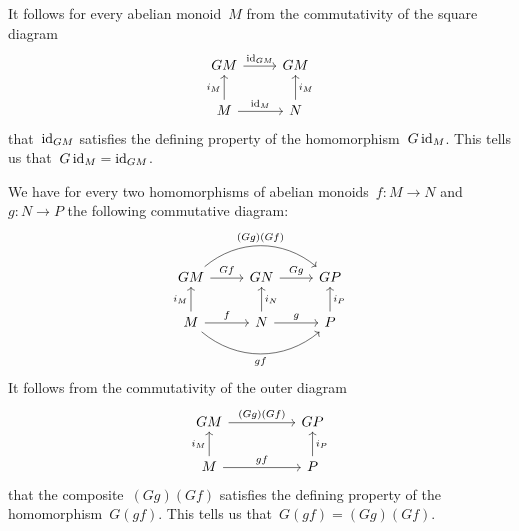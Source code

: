 It follows for every abelian monoid~$M$ from the commutativity of the square diagram
\[
	\begin{tikzcd}
		G M
		\arrow{r}[above]{\id_{G M}}
		&
		G M
		\\
		M
		\arrow{u}[left]{i_M}
		\arrow{r}[above]{\id_M}
		&
		N
		\arrow{u}[right]{i_M}
	\end{tikzcd}
\]
that~$\operatorname{id}_{G M}$ satisfies the defining property of the homomorphism~$G \operatorname{id}_M$.
This tells us that~$G \operatorname{id}_M = \operatorname{id}_{G M}$.

We have for every two homomorphisms of abelian monoids~$f \colon M \to N$ and~$g \colon N \to P$ the following commutative diagram:
\[
	\begin{tikzcd}
		G M
		\arrow[bend left = 40]{rr}[above]{(G g) (G f)}
		\arrow{r}[above]{G f}
		&
		G N
		\arrow{r}[above]{G g}
		&
		G P
		\\
		M
		\arrow{u}[left]{i_M}
		\arrow{r}[above]{f}
		\arrow[bend right = 40]{rr}[below]{gf}
		&
		N
		\arrow{u}[right]{i_N}
		\arrow{r}[above]{g}
		&
		P
		\arrow{u}[right]{i_P}
	\end{tikzcd}
\]
It follows from the commutativity of the outer diagram
\[
	\begin{tikzcd}[column sep = huge]
		G M
		\arrow{r}[above]{(G g) (G f)}
		&
		G P
		\\
		M
		\arrow{u}[left]{i_M}
		\arrow{r}[above]{g f}
		&
		P
		\arrow{u}[right]{i_P}
	\end{tikzcd}
\]
that the composite~$(G g) (G f)$ satisfies the defining property of the homomorphism~$G (g f)$.
This tells us that~$G (g f) = (G g) (G f)$.
